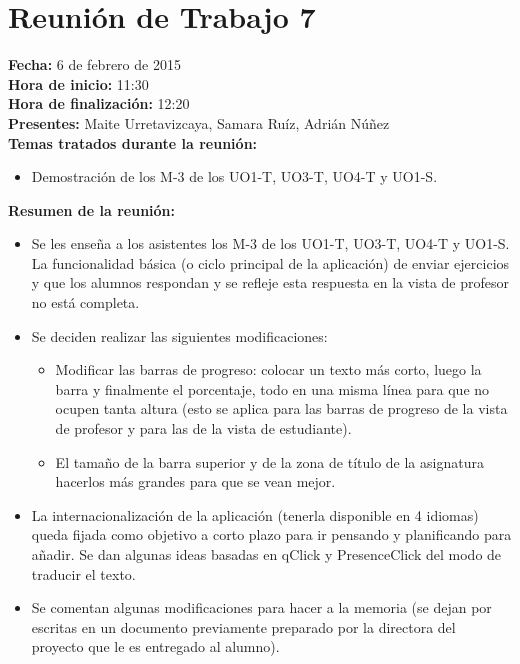 \section*{Reunión de Trabajo 7}

\textbf{Fecha:} 6 de febrero de 2015\\

\textbf{Hora de inicio:} 11:30\\

\textbf{Hora de finalización:} 12:20\\

\textbf{Presentes:} Maite Urretavizcaya, Samara Ruíz, Adrián Núñez\\

\textbf{Temas tratados durante la reunión:}

\begin{itemize}
\item Demostración de los M-3 de los UO1-T, UO3-T, UO4-T y UO1-S.
\end{itemize}

\textbf{Resumen de la reunión:}

\begin{itemize}
\item Se les enseña a los asistentes los M-3 de los UO1-T, UO3-T, UO4-T y UO1-S. La funcionalidad básica (o ciclo principal de la aplicación) de enviar ejercicios y que los alumnos respondan y se refleje esta respuesta en la vista de profesor no está completa.

\item Se deciden realizar las siguientes modificaciones:
\begin{itemize}
	\item Modificar las barras de progreso: colocar un texto más corto, luego la barra y finalmente el porcentaje, 			todo en una misma línea para que no ocupen tanta altura (esto se aplica para las barras de progreso de la vista de profesor y para las de la vista de estudiante).
	
	\item El tamaño de la barra superior y de la zona de título de la asignatura hacerlos más grandes para que se vean mejor.
\end{itemize}

\item La internacionalización de la aplicación (tenerla disponible en 4 idiomas) queda fijada como objetivo a corto plazo para ir pensando y planificando para añadir. Se dan algunas ideas basadas en qClick y PresenceClick del modo de traducir el texto.

\item Se comentan algunas modificaciones para hacer a la memoria (se dejan por escritas en un documento previamente preparado por la directora del proyecto que le es entregado al alumno).
\end{itemize}

